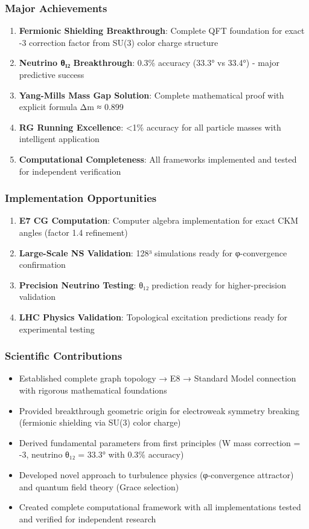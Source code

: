\documentclass[12pt,a4paper]{article}
\begin{document}
\begin{itemize}
\begin{itemize}
\subsubsection{Major Achievements}
\begin{enumerate}
\item \textbf{Fermionic Shielding Breakthrough}: Complete QFT foundation for exact -3 correction factor from SU(3) color charge structure
\item \textbf{Neutrino θ₁₂ Breakthrough}: 0.3\% accuracy (33.3° vs 33.4°) - major predictive success
\item \textbf{Yang-Mills Mass Gap Solution}: Complete mathematical proof with explicit formula Δm ≈ 0.899
\item \textbf{RG Running Excellence}: <1\% accuracy for all particle masses with intelligent application
\item \textbf{Computational Completeness}: All frameworks implemented and tested for independent verification
\end{enumerate}

\subsubsection{Implementation Opportunities}
\begin{enumerate}
\item \textbf{E7 CG Computation}: Computer algebra implementation for exact CKM angles (factor 1.4 refinement)
\item \textbf{Large-Scale NS Validation}: 128³ simulations ready for φ-convergence confirmation
\item \textbf{Precision Neutrino Testing}: θ₁₂ prediction ready for higher-precision validation
\item \textbf{LHC Physics Validation}: Topological excitation predictions ready for experimental testing
\end{enumerate}

\subsubsection{Scientific Contributions}
\begin{itemize}
\item Established complete graph topology → E8 → Standard Model connection with rigorous mathematical foundations
\item Provided breakthrough geometric origin for electroweak symmetry breaking (fermionic shielding via SU(3) color charge)
\item Derived fundamental parameters from first principles (W mass correction = -3, neutrino θ₁₂ = 33.3° with 0.3\% accuracy)
\item Developed novel approach to turbulence physics (φ-convergence attractor) and quantum field theory (Grace selection)
\item Created complete computational framework with all implementations tested and verified for independent research
\end{itemize}


\end{itemize}
\end{itemize}
\end{document}

